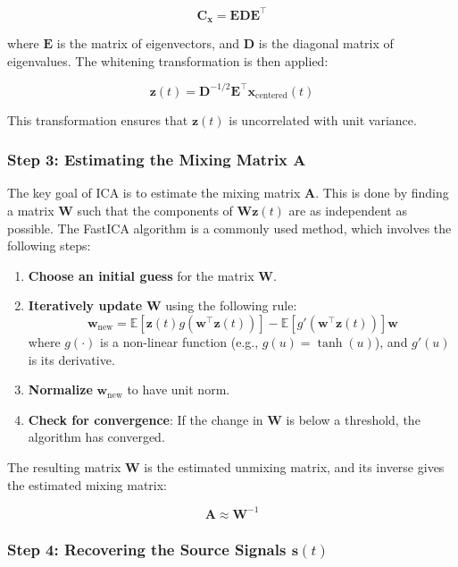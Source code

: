 \documentclass{exam}
\begin{document}
\[
\mathbf{C}_{\mathbf{x}} = \mathbf{E} \mathbf{D} \mathbf{E}^\top
\]

where \( \mathbf{E} \) is the matrix of eigenvectors, and \( \mathbf{D} \) is the diagonal matrix of eigenvalues. The whitening transformation is then applied:

\[
\mathbf{z}(t) = \mathbf{D}^{-1/2} \mathbf{E}^\top \mathbf{x}_{\text{centered}}(t)
\]

This transformation ensures that \( \mathbf{z}(t) \) is uncorrelated with unit variance.

\subsubsection{Step 3: Estimating the Mixing Matrix \texorpdfstring{$\mathbf{A}$}{A}}

The key goal of ICA is to estimate the mixing matrix \( \mathbf{A} \). This is done by finding a matrix \( \mathbf{W} \) such that the components of \( \mathbf{W} \mathbf{z}(t) \) are as independent as possible. The FastICA algorithm is a commonly used method, which involves the following steps:

\begin{enumerate}
    \item\textbf{Choose an initial guess} for the matrix \( \mathbf{W} \).
    \item \textbf{Iteratively update} \( \mathbf{W} \) using the following rule:
    \[
    \mathbf{w}_{\text{new}} = \mathbb{E}[\mathbf{z}(t) g(\mathbf{w}^\top \mathbf{z}(t))] - \mathbb{E}[g'(\mathbf{w}^\top \mathbf{z}(t))] \mathbf{w}
    \]
    where \( g(\cdot) \) is a non-linear function (e.g., \( g(u) = \tanh(u) \)), and \( g'(u) \) is its derivative.
    \item \textbf{Normalize} \( \mathbf{w}_{\text{new}} \) to have unit norm.
    \item \textbf{Check for convergence}: If the change in \( \mathbf{W} \) is below a threshold, the algorithm has converged.
\end{enumerate}

The resulting matrix \( \mathbf{W} \) is the estimated unmixing matrix, and its inverse gives the estimated mixing matrix:

\[
\mathbf{A} \approx \mathbf{W}^{-1}
\]

\subsubsection{Step 4: Recovering the Source Signals \texorpdfstring{$\mathbf{s}(t)$}{s(t)}}
\end{document}
